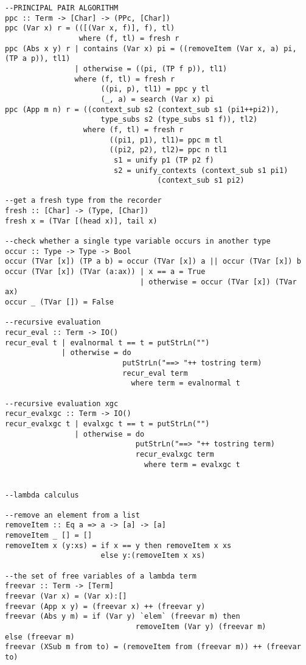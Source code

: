 \begin{verbatim}
--PRINCIPAL PAIR ALGORITHM
ppc :: Term -> [Char] -> (PPc, [Char])
ppc (Var x) r = (([(Var x, f)], f), tl)
                 where (f, tl) = fresh r
ppc (Abs x y) r | contains (Var x) pi = ((removeItem (Var x, a) pi, (TP a p)), tl1)
                | otherwise = ((pi, (TP f p)), tl1)
                where (f, tl) = fresh r
                      ((pi, p), tl1) = ppc y tl
                      (_, a) = search (Var x) pi
ppc (App m n) r = ((context_sub s2 (context_sub s1 (pi1++pi2)), 
                      type_subs s2 (type_subs s1 f)), tl2)
                  where (f, tl) = fresh r
                        ((pi1, p1), tl1)= ppc m tl
                        ((pi2, p2), tl2)= ppc n tl1
                         s1 = unify p1 (TP p2 f)
                         s2 = unify_contexts (context_sub s1 pi1) 
                                   (context_sub s1 pi2)

--get a fresh type from the recorder
fresh :: [Char] -> (Type, [Char])
fresh x = (TVar [(head x)], tail x)

--check whether a single type variable occurs in another type
occur :: Type -> Type -> Bool
occur (TVar [x]) (TP a b) = occur (TVar [x]) a || occur (TVar [x]) b
occur (TVar [x]) (TVar (a:ax)) | x == a = True
                               | otherwise = occur (TVar [x]) (TVar ax)
occur _ (TVar []) = False

--recursive evaluation
recur_eval :: Term -> IO()
recur_eval t | evalnormal t == t = putStrLn("")
             | otherwise = do
                           putStrLn("==> "++ tostring term)
                           recur_eval term
                             where term = evalnormal t

--recursive evaluation xgc
recur_evalxgc :: Term -> IO()
recur_evalxgc t | evalxgc t == t = putStrLn("")
                | otherwise = do
                              putStrLn("==> "++ tostring term)
                              recur_evalxgc term
                                where term = evalxgc t


--lambda calculus

--remove an element from a list
removeItem :: Eq a => a -> [a] -> [a]
removeItem _ [] = []
removeItem x (y:xs) = if x == y then removeItem x xs
                      else y:(removeItem x xs)

--the set of free variables of a lambda term
freevar :: Term -> [Term]
freevar (Var x) = (Var x):[]
freevar (App x y) = (freevar x) ++ (freevar y)
freevar (Abs y m) = if (Var y) `elem` (freevar m) then 
                              removeItem (Var y) (freevar m)
else (freevar m)
freevar (XSub m from to) = (removeItem from (freevar m)) ++ (freevar to)


\end{verbatim}
